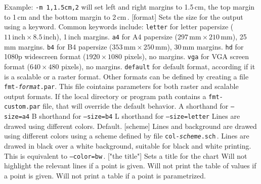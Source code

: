 \documentclass[letterpaper]{article}
\begin{document}
\begin{clioptions}
  Example: \texttt{-m 1,1.5cm,2} will set left and right margins to
  1.5\,cm, the top margin to 1\,cm and the bottom margin to 2\,cm\,.
[format] Sets the size for the output using a
  keyword. Common keywords include:
  \texttt{letter} for letter papersize ($11\,\textrm{inch}\times8.5\,\textrm{inch}$), 1\,inch margins.
  \texttt{a4} for A4 papersize ($297\,\textrm{mm}\times210\,\textrm{mm}$), 25\,mm margins.
  \texttt{b4} for B4 papersize ($353\,\textrm{mm}\times250\,\textrm{mm}$), 30\,mm margins.
  \texttt{hd} for 1080p widescreen format ($1920\times1080$ pixels), no margins.
  \texttt{vga} for VGA screen format ($640\times480$ pixels), no margins.
  \texttt{default} for default format, according if it is a scalable or a raster format.
  Other formats can be defined by creating a file \texttt{fmt-\textit{format}.par}. This file cointains
  parameters for both raster and scalable output formats.
  If the local directory or program path contains a \texttt{fmt-custom.par}
  file, that will override the default behavior.
\cliop A shorthand for \texttt{--size=a4}
\cliop B shorthand for \texttt{--size=b4}
\cliop L shorthand for \texttt{--size=letter}
 Lines are drawed using different colors. Default.
[scheme] Lines and background are drawed using different colors using a scheme defined
  by file \texttt{col-\textit{scheme}.sch}\,.
 Lines are drawed in black over a white background, suitable for black and white printing.
  This is equivalent to \texttt{--color=bw}\,.
["the title"] Sets a title for the chart
 Will not highlight the relevant lines if a point is given.
 Will not print the table of values if a point is given.
 Will not print a table if a point is parametrized.
\end{clioptions}
\end{document}
